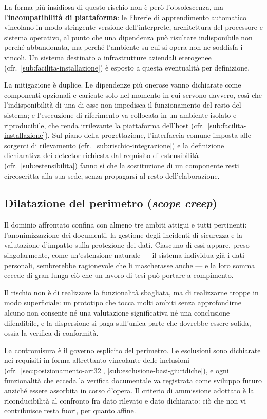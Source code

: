 La forma più insidiosa di questo rischio non è però l'obsolescenza, ma l'\textbf{incompatibilità di piattaforma}: le librerie di apprendimento automatico vincolano in modo stringente versione dell'interprete, architettura del processore e sistema operativo, al punto che una dipendenza può risultare indisponibile non perché abbandonata, ma perché l'ambiente su cui si opera non ne soddisfa i vincoli. Un sistema destinato a infrastrutture aziendali eterogenee (cfr.~\ref{sub:facilita-installazione}) è esposto a questa eventualità per definizione. \medskip

La mitigazione è duplice. Le dipendenze più onerose vanno dichiarate come componenti opzionali e caricate solo nel momento in cui servono davvero, così che l'indisponibilità di una di esse non impedisca il funzionamento del resto del sistema; e l'esecuzione di riferimento va collocata in un ambiente isolato e riproducibile, che renda irrilevante la piattaforma dell'host (cfr.~\ref{sub:facilita-installazione}). Sul piano della progettazione, l'interfaccia comune imposta alle sorgenti di rilevamento (cfr.~\ref{sub:rischio-integrazione}) e la definizione dichiarativa dei detector richiesta dal requisito di estensibilità (cfr.~\ref{sub:estensibilita}) fanno sì che la sostituzione di un componente resti circoscritta alla sua sede, senza propagarsi al resto dell'elaborazione.

\subsection{Dilatazione del perimetro (\textit{scope creep})}
\label{sub:rischio-scope-creep}
Il dominio affrontato confina con almeno tre ambiti attigui e tutti pertinenti: l'anonimizzazione dei documenti, la gestione degli incidenti di sicurezza e la valutazione d'impatto sulla protezione dei dati. Ciascuno di essi appare, preso singolarmente, come un'estensione naturale --- il sistema individua già i dati personali, sembrerebbe ragionevole che li mascherasse anche --- e la loro somma eccede di gran lunga ciò che un lavoro di tesi può portare a compimento. \medskip

Il rischio non è di realizzare la funzionalità sbagliata, ma di realizzarne troppe in modo superficiale: un prototipo che tocca molti ambiti senza approfondirne alcuno non consente né una valutazione significativa né una conclusione difendibile, e la dispersione si paga sull'unica parte che dovrebbe essere solida, ossia la verifica di conformità. \medskip

La contromisura è il governo esplicito del perimetro. Le esclusioni sono dichiarate nei requisiti in forma altrettanto vincolante delle inclusioni (cfr.~\ref{sec:posizionamento-art32}, \ref{sub:esclusione-basi-giuridiche}), e ogni funzionalità che ecceda la verifica documentale va registrata come sviluppo futuro anziché essere assorbita in corso d'opera. Il criterio di ammissione adottato è la riconducibilità al confronto fra dato rilevato e dato dichiarato: ciò che non vi contribuisce resta fuori, per quanto affine.

